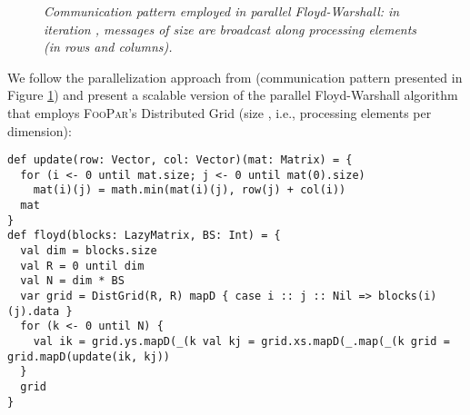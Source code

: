 \documentclass{article}
\newcommand{\framework}{{\rmfamily\scshape FooPar}\xspace}
\begin{document}
{\begin{algorithm}
{\begin{figure}
\begin{center}
\end{center}
\caption{\it Communication pattern employed in
parallel
Floyd-Warshall:
in iteration , messages of size  are broadcast along  processing elements (in rows and columns).}

\label{fig:floyd}
\end{figure}


\noindent We follow
the parallelization approach from \cite{floyd} (communication pattern presented in Figure \ref{fig:floyd}) and present a scalable version of
the \linebreak parallel Floyd-Warshall algorithm that employs \framework's Distri\-buted Grid (size
, i.e.,  processing elements per dimension):



\begin{lstlisting}[caption=\it Floyd-Warshall implementation in FooPar,label=lst:fw]
def update(row: Vector, col: Vector)(mat: Matrix) = {
  for (i <- 0 until mat.size; j <- 0 until mat(0).size)
    mat(i)(j) = math.min(mat(i)(j), row(j) + col(i))
  mat
}
def floyd(blocks: LazyMatrix, BS: Int) = {
  val dim = blocks.size
  val R = 0 until dim
  val N = dim * BS
  var grid = DistGrid(R, R) mapD { case i :: j :: Nil => blocks(i)(j).data }
  for (k <- 0 until N) {
    val ik = grid.ys.mapD(_(k val kj = grid.xs.mapD(_.map(_(k grid = grid.mapD(update(ik, kj))
  }
  grid
}
\end{lstlisting}


}
\end{algorithm}}
\end{document}

